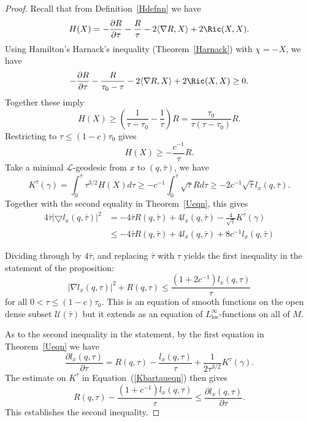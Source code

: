 \begin{proof}
Recall that from Definition~\ref{Hdefnn} we have
$$H(X)=-\frac{\partial R}{\partial
\tau}-\frac{R}{\tau}-2\langle \nabla R,X\rangle+2\Ric(X,X).$$
Using Hamilton's Harnack's inequality (Theorem~\ref{Harnack}) with
$\chi=-X$, we have
\begin{equation*}
-\frac{\partial R}{\partial \tau}-\frac{R}{\tau_0-\tau}-2\langle
\nabla R,X\rangle+2\Ric(X,X)\ge 0.\end{equation*}
 Together these imply
 $$H(X)\ge \left(\frac{1}{\tau-\tau_0}-\frac{1}{\tau}\right)R
 =\frac{\tau_0}{\tau(\tau-\tau_0)}R.$$
Restricting to $\tau\le (1-c)\tau_0$ gives
$$H(X)\ge -\frac{c^{-1}}{\tau}R.$$
Take a minimal ${\mathcal L}$-geodesic from $x$ to $(q,\bar\tau)$,
we have
\begin{equation}\label{Kbartaueqn}
K^{\bar\tau}(\gamma)=\int_0^{\bar\tau}\tau^{3/2}H(X)d\tau\ge
-c^{-1}\int_0^{\bar\tau}\sqrt{\tau}Rd\tau\ge
-2c^{-1}\sqrt{\bar\tau}l_x(q,\bar\tau). \end{equation} Together with
the second equality in Theorem~\ref{Ueqn}, this gives
\begin{align*}
4\bar\tau |\bigtriangledown l_x(q,\bar\tau)|^{2} & = -4\bar\tau
R(q,\bar\tau) + 4l_x(q,\bar\tau) -\frac{4}{\sqrt{\bar\tau}}
K^{\bar\tau}(\gamma)\\ & \le -4\bar\tau R(q,\bar\tau)
+4l_x(q,\bar\tau) + 8c^{-1}l_x(q,\bar\tau)
\end{align*}

Dividing through by $4\bar\tau$, and replacing $\bar\tau$ with
$\tau$ yields the first inequality in the statement of the
proposition:
$$|\nabla l_x(q,\tau)|^2+R(q,\tau)\le \frac{(1+2c^{-1})l_x(q,\tau)}{\tau}$$
for all $0<\tau\le (1-c)\tau_0.$ This is an equation of smooth
functions on the open dense subset ${\mathcal U}(\bar \tau)$ but it
extends as an equation of $L^\infty_\mathrm{loc}$-functions on all of
$M$.

As to the second inequality in the statement, by the first equation
in Theorem~\ref{Ueqn} we have
$$\frac{\partial l_x(q,\tau)}{\partial \tau}
=R(q,\tau)-\frac{l_x(q,\tau)}{\tau}+\frac{1}{2\tau^{3/2}}K^{\tau}(\gamma).$$
The estimate on $K^\tau$ in Equation~(\ref{Kbartaueqn}) then gives
$$R(q,\tau)-\frac{(1+c^{-1})l_x(q,\tau)}{\tau}\le
\frac{\partial l_x(q,\tau)}{\partial \tau}.$$ This establishes the
second inequality.
\end{proof}




